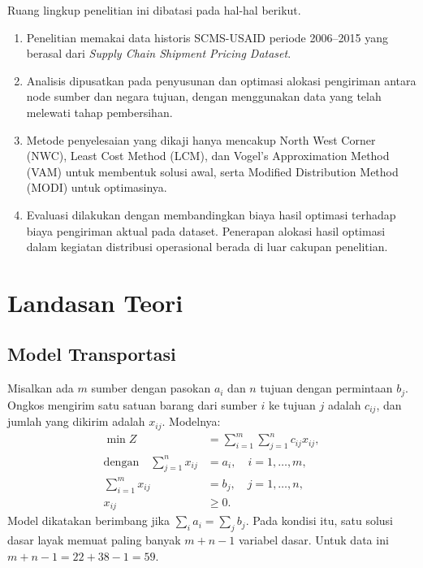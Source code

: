 \documentclass[a4paper,11pt]{article}
\begin{document}
Ruang lingkup penelitian ini dibatasi pada hal-hal berikut.

\begin{enumerate}
    \item Penelitian memakai data historis SCMS-USAID periode 2006--2015 yang berasal dari \textit{Supply Chain Shipment Pricing Dataset}.

    \item Analisis dipusatkan pada penyusunan dan optimasi alokasi pengiriman antara node sumber dan negara tujuan, dengan menggunakan data yang telah melewati tahap pembersihan.

    \item Metode penyelesaian yang dikaji hanya mencakup North West Corner (NWC), Least Cost Method (LCM), dan Vogel's Approximation Method (VAM) untuk membentuk solusi awal, serta Modified Distribution Method (MODI) untuk optimasinya.

    \item Evaluasi dilakukan dengan membandingkan biaya hasil optimasi terhadap biaya pengiriman aktual pada dataset. Penerapan alokasi hasil optimasi dalam kegiatan distribusi operasional berada di luar cakupan penelitian.
\end{enumerate}

\section{Landasan Teori}
\subsection{Model Transportasi}
Misalkan ada $m$ sumber dengan pasokan $a_i$ dan $n$ tujuan dengan permintaan $b_j$. Ongkos mengirim satu satuan barang dari sumber $i$ ke tujuan $j$ adalah $c_{ij}$, dan jumlah yang dikirim adalah $x_{ij}$. Modelnya:
\begin{align}
\min Z &= \sum_{i=1}^{m}\sum_{j=1}^{n} c_{ij}x_{ij}, \label{eq:obj}\\
\text{dengan}\quad \sum_{j=1}^{n} x_{ij} &= a_i, \quad i=1,\ldots,m, \label{eq:sup}\\
\sum_{i=1}^{m} x_{ij} &= b_j, \quad j=1,\ldots,n, \label{eq:dem}\\
x_{ij} &\ge 0. \label{eq:nonneg}
\end{align}
Model dikatakan berimbang jika $\sum_i a_i = \sum_j b_j$. Pada kondisi itu, satu solusi dasar layak memuat paling banyak $m+n-1$ variabel dasar. Untuk data ini $m+n-1 = 22+38-1 = 59$.
\end{document}
